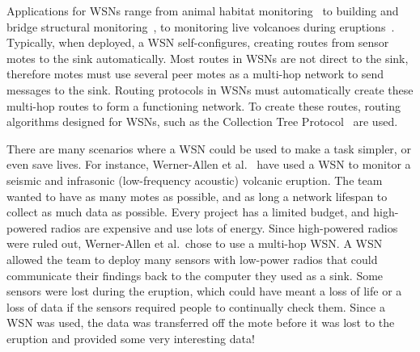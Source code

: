 Applications for WSNs range from animal habitat monitoring~\cite{duckisland,zebranet}
to building and bridge structural monitoring~\cite{StructuralMonitoring}, to 
monitoring live volcanoes during eruptions~\cite{volcano}. 
Typically, when deployed, a WSN self-configures, creating routes from sensor 
motes to the sink automatically. 
Most routes in WSNs are not direct to the sink, therefore motes must use 
several peer motes as a multi-hop network to send messages to the sink.
Routing protocols in WSNs must automatically create these multi-hop routes to 
form a functioning network.
To create these routes, routing algorithms designed for WSNs, such as the
Collection Tree Protocol~\cite{ctp} are used.

There are many scenarios where a WSN could be used to make a task 
simpler, or even save lives.
For instance, Werner-Allen et al.~\cite{volcano} have used a WSN to monitor
a seismic and infrasonic (low-frequency acoustic)  volcanic eruption. The team wanted to have as many motes as possible, and
as long a network lifespan to collect as much data as possible. Every project 
has a limited budget, and high-powered radios are expensive and use lots of energy. 
Since high-powered radios were ruled out, Werner-Allen et al.\ chose to use
a multi-hop WSN. A WSN allowed the team to deploy many sensors with low-power radios 
that could communicate their findings back to the computer they used as a sink. 
Some sensors were lost during the eruption, which could have meant a loss of life or a loss of data
if the sensors required people to continually check them. Since a WSN was
used, the data was transferred off the mote before it was lost to the eruption and provided some
very interesting data!

\begin{figure}
  \end{figure}

